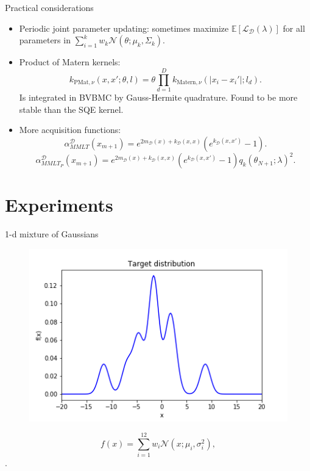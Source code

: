 \documentclass[pdf]{beamer}
\def \Ev {{\mathbb E}}
\begin{document}
\begin{frame}
\begin{block}{Practical considerations}
	\begin{itemize}
	\item Periodic joint parameter updating: sometimes maximize $\Ev[\mathcal{L}_\mathcal{D}(\lambda)]$ for all parameters in $\sum_{i=1}^k w_k \mathcal{N}(\theta;\mu_k,\Sigma_k)$.
	\item Product of Matern kernels:
	\begin{equation*}
	 k_{\text{PMat},\nu}(x,x';\theta,l) = \theta \prod_{d=1}^D k_{\text{Matern},\nu}(|x_i-x_i'|;l_d).
	\end{equation*}
	Is integrated in BVBMC by Gauss-Hermite quadrature. Found to be more stable than the SQE kernel.
	\item More acquisition functions:
	\begin{equation*}
	\alpha^\mathcal{D}_{MMLT}(x_{m+1}) = e^{2 m_\mathcal{D}(x) + k_\mathcal{D}(x,x)} \left(e^{k_\mathcal{D}(x,x')}-1\right).
	\end{equation*}
	\begin{equation*}
	\alpha^\mathcal{D}_{MMLT_P}(x_{m+1}) = e^{2 m_\mathcal{D}(x) + k_\mathcal{D}(x,x)} \left(e^{k_\mathcal{D}(x,x')}-1\right)q_k(\theta_{N+1};\lambda)^2.
	\end{equation*}
	\end{itemize}
\end{block}
\end{frame}

\section{Experiments}
\begin{frame}
\begin{block}{1-d mixture of Gaussians}
\begin{figure}
	\centering
	\includegraphics[width=0.6\linewidth]{figs/targetexil1a.png}
\end{figure}
\begin{displaymath}
f(x) = \sum_{i=1}^{12} w_i \mathcal{N}(x;\mu_i,\sigma^2_i),
\end{displaymath}
.
\end{block}
\end{frame}

\begin{frame}

\end{frame}
\end{document}
